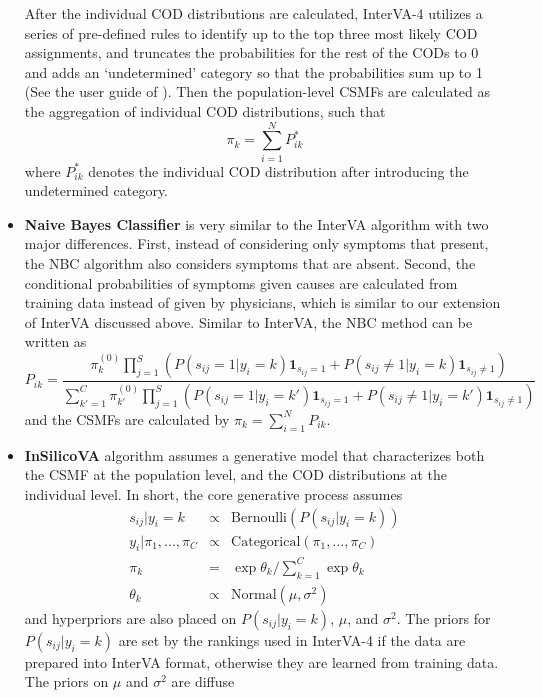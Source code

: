 \begin{itemize}
  After the individual COD distributions are calculated, InterVA-4
  utilizes a series of pre-defined rules to identify up to the top three
  most likely COD assignments, and truncates the probabilities for the
  rest of the CODs to 0 and adds an `undetermined' category so that the
  probabilities sum up to 1 (See the user guide of \citet{2015interVA}).
  Then the population-level CSMFs are calculated as the aggregation of
  individual COD distributions, such that \[
  \pi_k = \sum_{i=1}^N P^*_{ik}
  \] where \(P^*_{ik}\) denotes the individual COD distribution after
  introducing the undetermined category.
\item
  \textbf{Naive Bayes Classifier} \citep{miasnikof2015naive} is very
  similar to the InterVA algorithm with two major differences. First,
  instead of considering only symptoms that present, the NBC algorithm
  also considers symptoms that are absent. Second, the conditional
  probabilities of symptoms given causes are calculated from training
  data instead of given by physicians, which is similar to our extension
  of InterVA discussed above. Similar to InterVA, the NBC method can be
  written as \[
  P_{ik} = \frac{\pi_{k}^{(0)} \prod_{j=1}^S (P(s_{ij}=1|y_{i}=k) \mathbf{1}_{s_{ij} = 1} + P(s_{ij} \neq 1|y_{i}=k) \mathbf{1}_{s_{ij} \neq 1})}
  {\sum_{k' = 1}^C \pi_{k'}^{(0)} \prod_{j=1}^S (P(s_{ij}=1|y_{i}=k') \mathbf{1}_{s_{ij} = 1}+ P(s_{ij} \neq 1|y_{i}=k') \mathbf{1}_{s_{ij} \neq 1})}
  \] and the CSMFs are calculated by \(\pi_k = \sum_{i=1}^N P_{ik}\).
\item
  \textbf{InSilicoVA} algorithm \citep{insilico} assumes a generative
  model that characterizes both the CSMF at the population level, and
  the COD distributions at the individual level. In short, the core
  generative process assumes \begin{eqnarray} 
  s_{ij} | y_i = k &\propto& \mbox{Bernoulli}(P(s_{ij} | y_i = k)) \\
  y_i | \pi_1, ..., \pi_C &\propto& \mbox{Categorical}(\pi_1, ..., \pi_C) \\
  \pi_k &=& \exp \theta_k / \sum_{k=1}^C \exp \theta_k \\
  \theta_k &\propto& \mbox{Normal}(\mu, \sigma^2)
  \end{eqnarray} and hyperpriors are also placed on
  \(P(s_{ij} | y_i = k)\), \(\mu\), and \(\sigma^2\). The priors for
  \(P(s_{ij} | y_i = k)\) are set by the rankings used in InterVA-4 if
  the data are prepared into InterVA format, otherwise they are learned
  from training data. The priors on \(\mu\) and \(\sigma^2\) are diffuse

\end{itemize}
